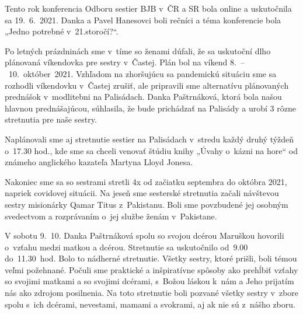 Tento rok konferencia Odboru sestier BJB v~ČR a SR bola online a uskutočnila sa 19.~6.~2021. Danka a Pavel Hanesovci boli rečníci a téma konferencie bola „Jedno potrebné v~21.storočí?“.

Po letných prázdninách sme v~tíme so ženami dúfali, že sa uskutoční dlho plánovaná víkendovka pre sestry v~Častej. Plán bol na víkend 8.~--~10.~október~2021. Vzhľadom na zhoršujúcu sa pandemickú situáciu sme sa rozhodli víkendovku v~Častej zrušiť, ale pripravili sme alternatívu plánovaných prednášok v~modlitebni na Palisádach. Danka Paštrnáková, ktorá bola našou hlavnou prednášajúcou, súhlasila, že bude prichádzať na Palisády a urobí 3 rôzne stretnutia pre naše sestry.

Naplánovali sme aj stretnutie sestier na Palisádach v~stredu každý druhý týždeň o~17.30 hod., kde sme sa chceli venovať štúdiu knihy „Úvahy o~kázni na hore“ od známeho anglického kazateľa Martyna Lloyd Jonesa.

Nakoniec sme sa so sestrami stretli 4x od začiatku septembra do októbra 2021, napriek covidovej situácii. Na jeseň sme sesterské stretnutia začali návštevou sestry misionárky Qamar Titus z~Pakistanu. Boli sme povzbudené jej osobným svedectvom a rozprávaním o~jej službe ženám v~Pakistane.

V sobotu 9.~10. Danka Paštrnáková spolu so svojou dcérou Maruškou hovorili o~vzťahu medzi matkou a dcérou. Stretnutie sa uskutočnilo od~9.00 do~11.30~hod. Bolo to nádherné stretnutie. Všetky sestry, ktoré prišli, boli témou veľmi požehnané. Počuli sme praktické a inšpiratívne spôsoby ako prehĺbiť vzťahy so svojimi matkami a so svojimi dcérami, s~Božou láskou k~nám a Jeho prijatím nás ako zdrojom posilnenia. Na toto stretnutie boli pozvané všetky sestry v~zbore spolu s~ich dcérami, nevestami, mamami a svokrami, aj ak nie sú z~nášho zboru.

